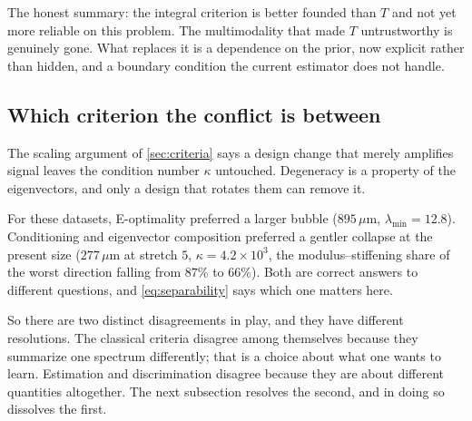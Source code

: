 \documentclass[10pt]{article}
\begin{document}
The honest summary: the integral criterion is better founded than $T$ and not yet more
reliable on this problem. The multimodality that made $T$ untrustworthy is genuinely gone.
What replaces it is a dependence on the prior, now explicit rather than hidden, and a
boundary condition the current estimator does not handle.

\subsection*{Which criterion the conflict is between}

The scaling argument of \cref{sec:criteria} says a design change that merely amplifies signal
leaves the condition number $\kappa$ untouched. Degeneracy is a property of the eigenvectors,
and only a design that rotates them can remove it.

For these datasets, E-optimality preferred a larger bubble ($895\,\mu$m,
$\lambda_{\min} = 12.8$). Conditioning and eigenvector composition preferred a gentler collapse
at the present size ($277\,\mu$m at stretch $5$, $\kappa = 4.2\times10^3$, the
modulus--stiffening share of the worst direction falling from $87\%$ to $66\%$). Both are
correct answers to different questions, and \eqref{eq:separability} says which one matters
here.

So there are two distinct disagreements in play, and they have different resolutions. The
classical criteria disagree among themselves because they summarize one spectrum
differently; that is a choice about what one wants to learn. Estimation and discrimination
disagree because they are about different quantities altogether. The next subsection
resolves the second, and in doing so dissolves the first.
\end{document}
